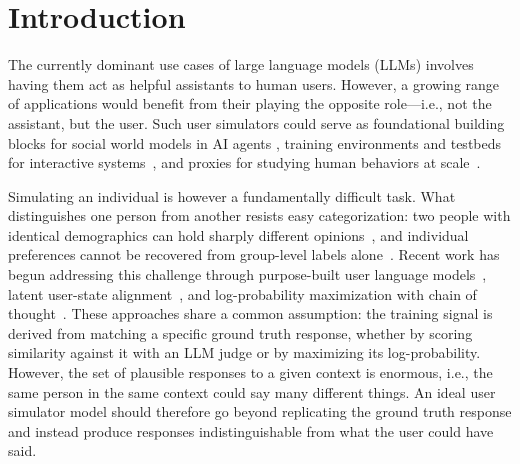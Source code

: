 \documentclass[11pt]{article}
\begin{document}
\section{Introduction}
The currently dominant use cases of large language models (LLMs) involves having them act as helpful assistants to human users. However, a growing range of applications would benefit  from their playing  the opposite role---i.e.,  not the assistant, but the user.
Such user simulators could serve as foundational building blocks for social world models in AI agents \citep{rabinowitz2018machine, collins2024building}, training environments and testbeds for interactive systems~\citep{abdulhai2025consistently, mehri2025goal}, and proxies for studying human behaviors at scale~\citep{aher2023using, park2023generative, lu2025multiturn}.

Simulating an individual is however a fundamentally difficult task. What distinguishes one person from another resists easy categorization: two people with identical demographics can hold sharply different opinions~\citep{hwang2023aligning, santurkar2023opinions}, and individual preferences cannot be recovered from group-level labels alone~\citep{ kirk2024prism, jiang2024indievalue}. Recent work has begun addressing this challenge through purpose-built user language models~\citep{naous2025flipping}, latent user-state alignment~\citep{wu2026humanlm}, and log-probability maximization with chain of thought~\citep{gandhi2026dialogue}.
These approaches share a common assumption: the training signal is derived from matching a specific ground truth response, whether by scoring similarity against it with an LLM judge or by  maximizing its log-probability. However, the set of plausible responses to a given context is enormous, i.e., the same person in the same context could say many different things. An ideal user simulator model should therefore go beyond replicating the ground truth response and instead produce responses indistinguishable from what the user {could have said}.

\end{document}

